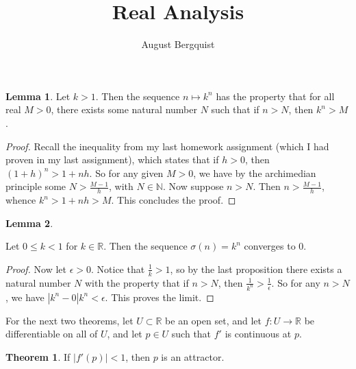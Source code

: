 \documentclass[12pt, letterpaper]{article}
\title{Real Analysis}
\author{August Bergquist}
\newcommand{\R}{\mathbb{R}}
\newcommand{\N}{\mathbb{N}}
\theoremstyle{definition}
\newtheorem{theorem}{Theorem}
\newtheorem{lemma}{Lemma}
\begin{document}
\maketitle

\begin{lemma}\label{unboundedLemma}
    Let $k > 1$. Then the sequence $ n\mapsto k^n $ has the property that for all real $M>0$, there exists some natural number $N$ such that 
    if $n > N$, then $ k^n > M $. 

\end{lemma}

\begin{proof}
    Recall the inequality from my last homework assignment (which I had proven in my last assignment), which states that if $h > 0$, then $(1 + h)^n > 1 + nh$.
    So for any given $M> 0$, we have by the archimedian principle some $N > \frac{M-1}{h}$, with $ N\in \N $. Now suppose $n> N$. Then $n > \frac{M-1}{h}$, 
    whence $k^n > 1 + nh > M$. This concludes the proof.
\end{proof}

\begin{lemma}\label{convergenceLemma}

    Let $0\le k< 1$ for $k\in \R$. Then the sequence $\sigma(n) = k^n$ converges to $0$.  

\end{lemma}

\begin{proof}
    Now let $\epsilon > 0$. Notice that $ \frac{1}{k} > 1 $, so by the last proposition there exists a natural number $N$ with the 
    property that if $n > N$, then $ \frac{1}{k^n} > \frac{1}{\epsilon} $. So for any $n > N$, we have $|k^n - 0| k^n < \epsilon $. This proves the limit. 
\end{proof}

For the next two theorems, let $U\subset \R$ be an open set, and let $f:U \to \R$ be differentiable on all of $U$, and let $p\in U$ such that $f'$ is continuous
at $p$.

\begin{theorem}
     If $|f'(p)| < 1$, then $ p $ is an attractor.
\end{theorem}
\end{document}
